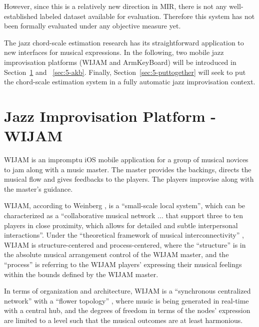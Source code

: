 However, since this is a relatively new direction in MIR, there is not any well-established labeled dataset available for evaluation. Therefore this system has not been formally evaluated under any objective measure yet.

The jazz chord-scale estimation research has its straightforward application to new interfaces for musical expressions. In the following, two mobile jazz improvisation platforms (WIJAM and ArmKeyBoard) will be introduced in Section~\ref{sec:5-wijam} and ~\ref{sec:5-akb}. Finally, Section~\ref{sec:5-puttogether} will seek to put the chord-scale estimation system in a fully automatic jazz improvisation context.

\section{Jazz Improvisation Platform - WIJAM} \label{sec:5-wijam}
WIJAM is an impromptu iOS mobile application for a group of musical novices to jam along with a music master. The master provides the backings, directs the musical flow and gives feedbacks to the players. The players improvise along with the master's guidance.

WIJAM, according to Weinberg \cite{weinberg2005interconnected}, is a ``small-scale local system'', which can be characterized as a ``collaborative musical network ... that support three to ten players in close proximity, which allows for detailed and subtle interpersonal interactions''. Under the ``theoretical framework of musical interconnectivity'' \cite{weinberg2005interconnected}, WIJAM is structure-centered and process-centered, where the ``structure'' is in the absolute musical arrangement control of the WIJAM master, and the ``process'' is referring to the WIJAM players' expressing their musical feelings within the bounds defined by the WIJAM master.

In terms of organization and architecture, WIJAM is a ``synchronous centralized network'' with a ``flower topology'' \cite{weinberg2005interconnected}, where music is being generated in real-time with a central hub, and the degrees of freedom in terms of the nodes' expression are limited to a level such that the musical outcomes are at least harmonious.

